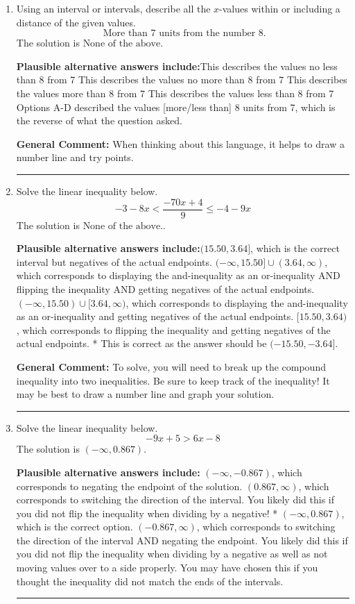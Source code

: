 \documentclass{extbook}[14pt]
\newcommand{\litem}[1]{\item #1

\rule{\textwidth}{0.4pt}}
\begin{document}
\begin{enumerate}\litem{
Using an interval or intervals, describe all the $x$-values within or including a distance of the given values.
\[ \text{ More than } 7 \text{ units from the number } 8. \]The solution is \( \text{None of the above} \).\begin{enumerate}[label=\Alph*.]
\textbf{Plausible alternative answers include:}This describes the values no less than 8 from 7
This describes the values no more than 8 from 7
This describes the values more than 8 from 7
This describes the values less than 8 from 7
Options A-D described the values [more/less than] 8 units from 7, which is the reverse of what the question asked.
\end{enumerate}

\textbf{General Comment:} When thinking about this language, it helps to draw a number line and try points.
}
\litem{
Solve the linear inequality below.
\[ -3 - 8 x < \frac{-70 x + 4}{9} \leq -4 - 9 x \]The solution is \( \text{None of the above.} \).\begin{enumerate}[label=\Alph*.]
\textbf{Plausible alternative answers include:}$(15.50, 3.64]$, which is the correct interval but negatives of the actual endpoints.
$(-\infty, 15.50] \cup (3.64, \infty)$, which corresponds to displaying the and-inequality as an or-inequality AND flipping the inequality AND getting negatives of the actual endpoints.
$(-\infty, 15.50) \cup [3.64, \infty)$, which corresponds to displaying the and-inequality as an or-inequality and getting negatives of the actual endpoints.
$[15.50, 3.64)$, which corresponds to flipping the inequality and getting negatives of the actual endpoints.
* This is correct as the answer should be $(-15.50, -3.64]$.
\end{enumerate}

\textbf{General Comment:} To solve, you will need to break up the compound inequality into two inequalities. Be sure to keep track of the inequality! It may be best to draw a number line and graph your solution.
}
\litem{
Solve the linear inequality below.
\[ -9x + 5 > 6x -8 \]The solution is \( (-\infty, 0.867) \).\begin{enumerate}[label=\Alph*.]
\textbf{Plausible alternative answers include:} $(-\infty, -0.867)$, which corresponds to negating the endpoint of the solution.
 $(0.867, \infty)$, which corresponds to switching the direction of the interval. You likely did this if you did not flip the inequality when dividing by a negative!
* $(-\infty, 0.867)$, which is the correct option.
 $(-0.867, \infty)$, which corresponds to switching the direction of the interval AND negating the endpoint. You likely did this if you did not flip the inequality when dividing by a negative as well as not moving values over to a side properly.
You may have chosen this if you thought the inequality did not match the ends of the intervals.
\end{enumerate}

}
\end{enumerate}
\end{document}
